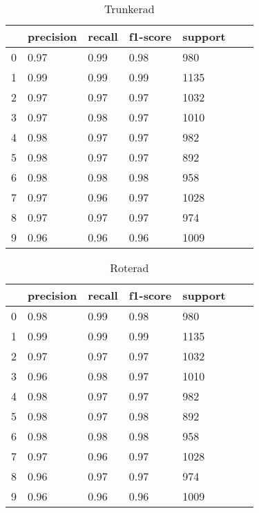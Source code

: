 \documentclass[12pt,a4paper]{article}
\begin{document}
\begin{table}[t]
	\centering
	\footnotesize
	\caption{Trunkerad}
	\begin{tabular}{lllllll}
      \hline 
 &   precision  &  recall & f1-score &  support \\
      \hline 
           0   &    0.97   &   0.99   &   0.98   &    980 \\
           1    &   0.99   &   0.99   &   0.99   &   1135 \\
           2   &    0.97  &    0.97  &    0.97  &    1032 \\
           3    &   0.97  &    0.98  &    0.97   &   1010 \\
           4    &   0.98  &    0.97  &    0.97   &    982 \\
           5   &    0.98 &     0.97  &    0.97   &    892 \\
           6  &     0.98  &    0.98  &    0.98   &    958 \\
           7   &    0.97   &   0.96   &   0.97   &   1028 \\
           8  &     0.97   &   0.97   &   0.97   &    974 \\
           9  &     0.96  &    0.96   &   0.96   &   1009 \\
           	\end{tabular}
\end{table}
           
           
           
           

\begin{table}[t]
	\centering
	\footnotesize
	\caption{Roterad}
	\begin{tabular}{lllllll}
      \hline 
      &     precision &   recall &  f1-score &  support \\
      \hline 
	0   &    0.98   &   0.99   &   0.98  &     980 \\
           1   &    0.99   &   0.99   &   0.99   &   1135 \\
           2   &    0.97   &   0.97   &   0.97   &   1032 \\
           3   &    0.96  &    0.98   &   0.97   &   1010 \\
           4   &    0.98   &   0.97   &   0.97   &    982 \\
           5  &     0.98   &   0.97   &   0.98   &    892 \\
           6   &    0.98  &    0.98   &   0.98   &    958 \\
           7   &    0.97  &    0.96  &    0.97   &   1028 \\
           8   &    0.96  &    0.97  &    0.97    &   974 \\
           9   &    0.96    &  0.96  &    0.96    &  1009 \\
           	\end{tabular}
\end{table}
\end{document}

